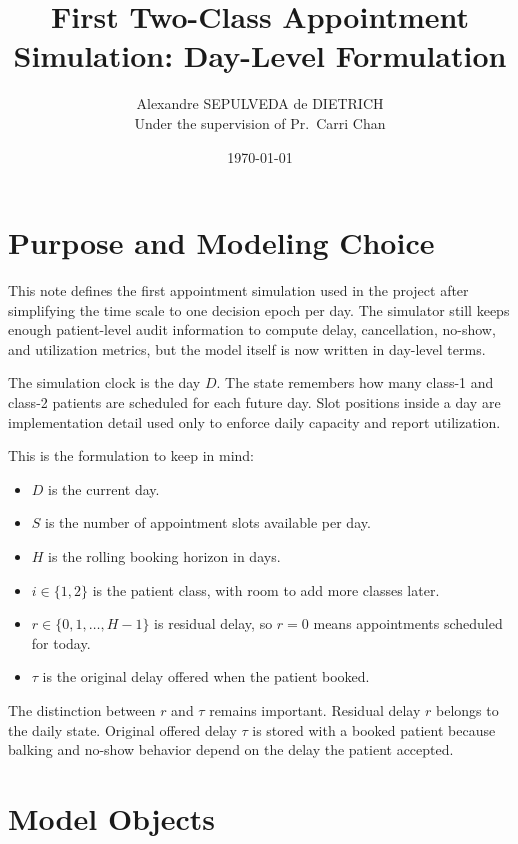 \documentclass[11pt]{article}
\title{First Two-Class Appointment Simulation: Day-Level Formulation}
\author{Alexandre SEPULVEDA de DIETRICH\\Under the supervision of Pr.~Carri Chan}
\date{\today}
\begin{document}
\maketitle
\setcounter{tocdepth}{2}
\tableofcontents
\bigskip

\section{Purpose and Modeling Choice}

This note defines the first appointment simulation used in the project after simplifying the
time scale to one decision epoch per day. The simulator still keeps enough patient-level audit
information to compute delay, cancellation, no-show, and utilization metrics, but the model itself
is now written in day-level terms.

\begin{keybox}[title={Core Choice}]
The simulation clock is the day \(D\). The state remembers how many class-1 and class-2 patients
are scheduled for each future day. Slot positions inside a day are implementation detail used only
to enforce daily capacity and report utilization.
\end{keybox}

This is the formulation to keep in mind:
\begin{itemize}[nosep]
    \item \(D\) is the current day.
    \item \(S\) is the number of appointment slots available per day.
    \item \(H\) is the rolling booking horizon in days.
    \item \(i\in\{1,2\}\) is the patient class, with room to add more classes later.
    \item \(r\in\{0,1,\dots,H-1\}\) is residual delay, so \(r=0\) means appointments scheduled for today.
    \item \(\tau\) is the original delay offered when the patient booked.
\end{itemize}

The distinction between \(r\) and \(\tau\) remains important. Residual delay \(r\) belongs to the
daily state. Original offered delay \(\tau\) is stored with a booked patient because balking and
no-show behavior depend on the delay the patient accepted.

\section{Model Objects}
\end{document}
